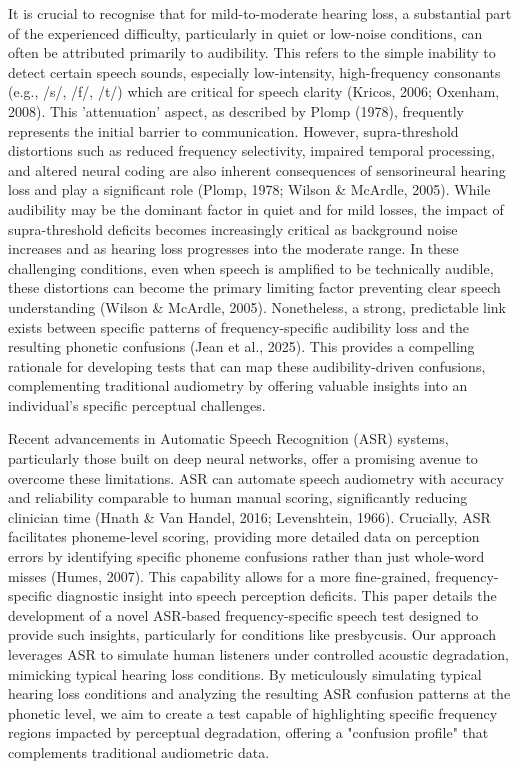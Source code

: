 \documentclass{article}
\begin{document}
It is crucial to recognise that for mild-to-moderate hearing loss, a substantial part of the experienced difficulty, particularly in quiet or low-noise conditions, can often be attributed primarily to audibility. This refers to the simple inability to detect certain speech sounds, especially low-intensity, high-frequency consonants (e.g., /s/, /f/, /t/) which are critical for speech clarity (Kricos, 2006; Oxenham, 2008). This 'attenuation' aspect, as described by Plomp (1978), frequently represents the initial barrier to communication. However, supra-threshold distortions such as reduced frequency selectivity, impaired temporal processing, and altered neural coding are also inherent consequences of sensorineural hearing loss and play a significant role (Plomp, 1978; Wilson \& McArdle, 2005). While audibility may be the dominant factor in quiet and for mild losses, the impact of supra-threshold deficits becomes increasingly critical as background noise increases and as hearing loss progresses into the moderate range. In these challenging conditions, even when speech is amplified to be technically audible, these distortions can become the primary limiting factor preventing clear speech understanding (Wilson \& McArdle, 2005). Nonetheless, a strong, predictable link exists between specific patterns of frequency-specific audibility loss and the resulting phonetic confusions (Jean et al., 2025). This provides a compelling rationale for developing tests that can map these audibility-driven confusions, complementing traditional audiometry by offering valuable insights into an individual's specific perceptual challenges.

Recent advancements in Automatic Speech Recognition (ASR) systems, particularly those built on deep neural networks, offer a promising avenue to overcome these limitations. ASR can automate speech audiometry with accuracy and reliability comparable to human manual scoring, significantly reducing clinician time (Hnath \& Van Handel, 2016; Levenshtein, 1966). Crucially, ASR facilitates phoneme-level scoring, providing more detailed data on perception errors by identifying specific phoneme confusions rather than just whole-word misses (Humes, 2007). This capability allows for a more fine-grained, frequency-specific diagnostic insight into speech perception deficits. This paper details the development of a novel ASR-based frequency-specific speech test designed to provide such insights, particularly for conditions like presbycusis. Our approach leverages ASR to simulate human listeners under controlled acoustic degradation, mimicking typical hearing loss conditions. By meticulously simulating typical hearing loss conditions and analyzing the resulting ASR confusion patterns at the phonetic level, we aim to create a test capable of highlighting specific frequency regions impacted by perceptual degradation, offering a "confusion profile" that complements traditional audiometric data.
\end{document}
